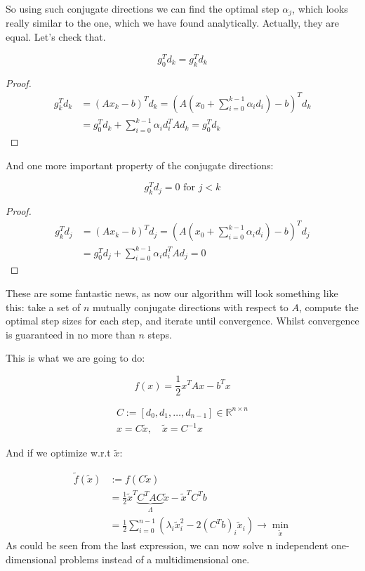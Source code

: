 So using such conjugate directions we can find the optimal step $\alpha_j$, which looks really similar to the one, which we have found analytically. Actually, they are equal. Let's check that. 

\begin{theorem}
    \[
        g_0^T d_k = g_k^T d_k
    \]
\end{theorem}
\begin{proof}
    \begin{align*}
        g_k^T d_k &= (A x_k - b)^T d_k = (A (x_0 + \sum^{k-1}_{i=0} \alpha_i d_i) - b)^T d_k \\
        &= g_0^T d_k + \sum^{k-1}_{i=0} \alpha_i d_i^T A d_k = g_0^T d_k
    \end{align*}
\end{proof}

And one more important property of the conjugate directions:
\begin{theorem}
    \[
        g_k^T d_j = 0 \text{ for } j < k
    \]
\end{theorem}
\begin{proof}
    \begin{align*}
        g_k^T d_j &= (A x_k - b)^T d_j = (A (x_0 + \sum^{k-1}_{i=0} \alpha_i d_i) - b)^T d_j \\
        &= g_0^T d_j + \sum^{k-1}_{i=0} \alpha_i d_i^T A d_j = 0
    \end{align*}
\end{proof} 

These are some fantastic news, as now our algorithm will look something like this: take a set of $n$ mutually conjugate directions with respect to $A$, compute the optimal step sizes for each step, and iterate until convergence. Whilst convergence is guaranteed in no more than $n$ steps.

This is what we are going to do: 

\[ 
    f(x) = \frac{1}{2} x^T A x - b^T x 
\] 

\begin{gather*}
    C:= [d_0, d_1, \ldots, d_{n-1}] \in \mathbb{R}^{n \times n} \\ 
    x = C \tilde{x}, \quad \tilde{x} = C^{-1} x
\end{gather*}

And if we optimize w.r.t $\tilde{x}$: 

\begin{align*}
    \tilde{f}(\tilde{x}) &:= f(C \tilde{x}) \\ 
    &= \frac{1}{2} \tilde{x}^T \underbrace{C^T A C}_{\Lambda} \tilde{x} - \tilde{x}^T C^T b \\
    &= \frac{1}{2} \sum^{n-1}_{i=0} \left(\lambda_i \tilde{x}_i^2 - 2 (C^T b)_i \tilde{x}_i \right) \to \min_{\tilde{x}}
\end{align*}
As could be seen from the last expression, we can now solve n independent one-dimensional problems instead of a multidimensional one.

